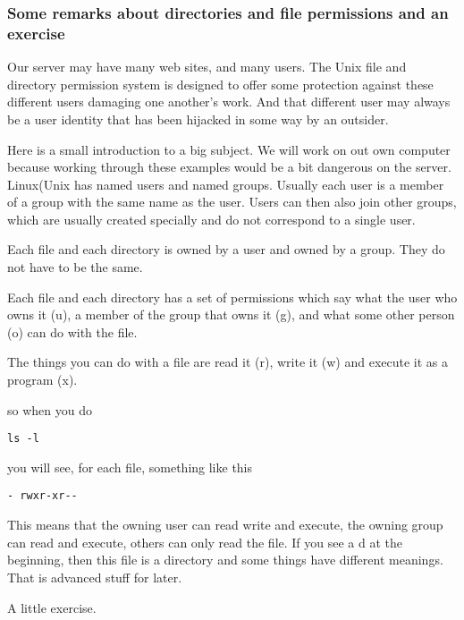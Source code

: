 \documentclass[12pt, a4paper]{article}
\begin{document}
\subsubsection*{Some remarks about directories and file permissions and an exercise}
Our server may have many web sites, and many users. The Unix file and directory permission system is designed to offer some protection against these different users damaging one another’s work. And that different user may always be a user identity that has been hijacked in some way by an outsider.

Here is a small introduction to a big subject. We will work on out own computer because working through these examples would be a bit dangerous on the server. 
Linux(Unix has named users and named groups. Usually each user is a member of a group with the same name as the user. Users can then also join other groups, which are usually created specially and do not correspond to a single user. 

Each file and each directory is owned by a user and owned by a group. They do not have to be the same.

Each file and each directory has a set of permissions which say what the user who owns it (u), a member of the group that owns it (g), and what some other person (o) can do with the file.

The things you can do with a file are read it (r), write it (w) and execute it as a program (x).

so when you do
\begin{verbatim}
ls -l
\end{verbatim}

you will see, for each file, something like this
\begin{verbatim}
- rwxr-xr--
\end{verbatim}
This means that the owning user can read write and execute, the owning group can read and execute, others can only read the file.
If you see a d at the beginning, then this file is a directory and some things have different meanings. That is advanced stuff for later.

A little exercise.
\end{document}
